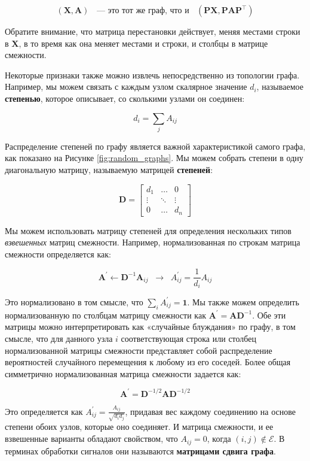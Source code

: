 $$
(\mathbf{X}, \mathbf{A}) \;\; \text{ — это тот же граф, что и } \;\;(\mathbf{P}\mathbf{X},\mathbf{P}\mathbf{A}\mathbf{P}^\top)
$$

Обратите внимание, что матрица перестановки действует, меняя местами строки в $\mathbf{X}$, в то время как она меняет местами и строки, и столбцы в матрице смежности.

Некоторые признаки также можно извлечь непосредственно из топологии графа. Например, мы можем связать с каждым узлом скалярное значение $d_i$, называемое \textbf{степенью}, которое описывает, со сколькими узлами он соединен:

$$
d_i=\sum_j A_{ij}
$$

Распределение степеней по графу является важной характеристикой самого графа, как показано на Рисунке \ref{fig:random_graphs}. Мы можем собрать степени в одну диагональную матрицу, называемую матрицей \textbf{степеней}:

$$
\mathbf{D} =\begin{bmatrix} d_1 & \ldots & 0 \\ \vdots &\ddots & \vdots \\0 & \ldots & d_n \end{bmatrix}
$$

Мы можем использовать матрицу степеней для определения нескольких типов \textit{взвешенных} матриц смежности. Например, нормализованная по строкам матрица смежности определяется как:

$$
\mathbf{A}^\prime \leftarrow \mathbf{D}^{-1}\mathbf{A}_{ij} \;\; \rightarrow\;\; A^\prime_{ij} = \frac{1}{d_i}A_{ij}
$$



Это нормализовано в том смысле, что $\sum_i A^\prime_{ij} = \mathbf{1}$. Мы также можем определить нормализованную по столбцам матрицу смежности как $\mathbf{A}^\prime = \mathbf{A}\mathbf{D}^{-1}$. Обе эти матрицы можно интерпретировать как «случайные блуждания» по графу, в том смысле, что для данного узла $i$ соответствующая строка или столбец нормализованной матрицы смежности представляет собой распределение вероятностей случайного перемещения к любому из его соседей. Более общая симметрично нормализованная матрица смежности задается как:

$$
\mathbf{A}^\prime=\mathbf{D}^{-1/2}\mathbf{A}\mathbf{D}^{-1/2}
$$

Это определяется как $A^\prime_{ij} = \frac{A_{ij}}{\sqrt{d_i d_j}}$, придавая вес каждому соединению на основе степени обоих узлов, которые оно соединяет. И матрица смежности, и ее взвешенные варианты обладают свойством, что $A_{ij} = 0$, когда $(i,j) \notin \mathcal{E}$. В терминах обработки сигналов они называются \textbf{матрицами сдвига графа}.

